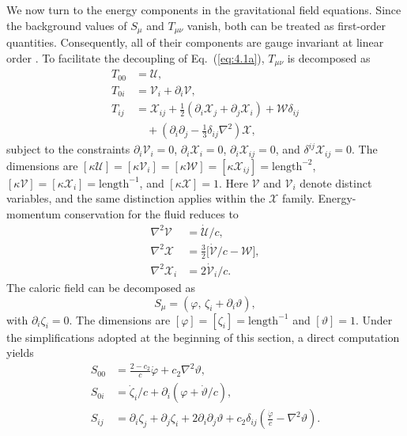 \documentclass[aps,prd,twocolumn]{revtex4-2}
\newcommand\p{\partial}
\begin{document}
We now turn to the energy components in the gravitational field equations. Since the background values of $S_\mu$ and $T_{\mu\nu}$ vanish, both can be treated as first-order quantities. Consequently, all of their components are gauge invariant at linear order \cite{Stewart1974.ProcRSocLondA.341.49}. To facilitate the decoupling of Eq.~(\ref{eq:4.1a}), $T_{\mu\nu}$ is decomposed as \cite{Flanagan2005.NewJPhys.7.204}
\begin{subequations}
\begin{align}
  T_{00} &= \mathcal{U}, \\
  T_{0i} &= \mathcal{V}_i + \p_i\mathcal{V}, \\
  T_{ij} &=  \mathcal{X}_{ij} + \frac{1}{2}(\p_i\mathcal{X}_j+\p_j\mathcal{X}_i) + \mathcal{W}\delta_{ij} \nonumber\\
    &\quad + (\p_i\p_j-\frac{1}{3}\delta_{ij}\nabla^2)\mathcal{X},
\end{align}
\end{subequations}
subject to the constraints $\p_i\mathcal{V}_i=0$, $\p_i\mathcal{X}_i=0$, $\p_i\mathcal{X}_{ij}=0$, and $\delta^{ij}\mathcal{X}_{ij}=0$. The dimensions are $[\kappa\mathcal{U}]=[\kappa\mathcal{V}_i]=[\kappa\mathcal{W}]=[\kappa\mathcal{X}_{ij}]=\mathrm{length}^{-2}$, $[\kappa\mathcal{V}]=[\kappa\mathcal{X}_i]=\mathrm{length}^{-1}$, and $[\kappa\mathcal{X}]=1$. Here $\mathcal{V}$ and $\mathcal{V}_i$ denote distinct variables, and the same distinction applies within the $\mathcal{X}$ family. Energy-momentum conservation for the fluid reduces to
\begin{subequations}
\begin{align}
  \nabla^2\mathcal{V} &= \dot{\mathcal{U}}/c, \\
  \nabla^2\mathcal{X} &= \frac{3}{2}\bigl[\dot{\mathcal{V}}/c - \mathcal{W}\bigr], \\
  \nabla^2\mathcal{X}_i &= 2\dot{\mathcal{V}}_i/c.
\end{align}
\end{subequations}
The caloric field can be decomposed as \cite{GaugeFreedom}
\begin{equation}
  S_\mu = (\varphi,\,\zeta_i+\p_i\vartheta),
\end{equation}
with $\p_i\zeta_i=0$. The dimensions are $[\varphi]=[\zeta_i]=\mathrm{length}^{-1}$ and $[\vartheta]=1$. Under the simplifications adopted at the beginning of this section, a direct computation yields
\begin{subequations}
\begin{align}
  S_{00} &= \frac{2-c_2}{c}\dot{\varphi} + c_2\nabla^2\vartheta, \\
  S_{0i} &= \dot{\zeta}_i/c + \p_i(\varphi+\dot{\vartheta}/c), \\
  S_{ij} &= \p_i\zeta_j + \p_j\zeta_i + 2\p_i\p_j\vartheta + c_2\delta_{ij}(\frac{\dot{\varphi}}{c} - \nabla^2\vartheta).
\end{align}
\end{subequations}
\end{document}
